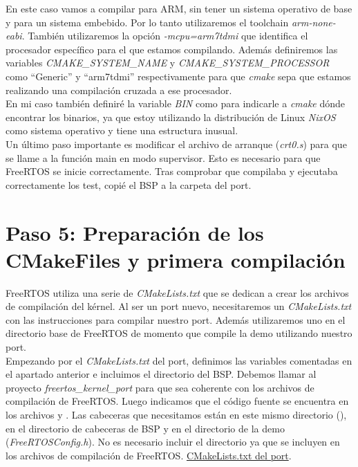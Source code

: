 En este caso vamos a compilar para ARM, sin tener un sistema operativo de base y para un sistema embebido. Por lo tanto utilizaremos el toolchain \emph{arm-none-eabi}. También utilizaremos la opción \emph{-mcpu=arm7tdmi} que identifica el procesador específico para el que estamos compilando. Además definiremos las variables \emph{CMAKE\_SYSTEM\_NAME} y \emph{CMAKE\_SYSTEM\_PROCESSOR} como ``Generic'' y ``arm7tdmi'' respectivamente para que \emph{cmake} sepa que estamos realizando una compilación cruzada a ese procesador.\\


En mi caso también definiré la variable \emph{BIN} como  para indicarle a \emph{cmake} dónde encontrar los binarios, ya que estoy utilizando la distribución de Linux \emph{NixOS} como sistema operativo y tiene una estructura inusual.\\

Un último paso importante es modificar el archivo de arranque (\emph{crt0.s}) para que se llame a la función main en modo supervisor. Esto es necesario para que FreeRTOS se inicie correctamente. Tras comprobar que compilaba y ejecutaba correctamente los test, copié el BSP a la carpeta del port.

\section{Paso 5: Preparación de los CMakeFiles y primera compilación}
FreeRTOS utiliza una serie de \emph{CMakeLists.txt} que se dedican a crear los archivos de compilación del kérnel. Al ser un port nuevo, necesitaremos un \emph{CMakeLists.txt} con las instrucciones para compilar nuestro port. Además utilizaremos uno en el directorio base de FreeRTOS de momento que compile la demo utilizando nuestro port.\\

Empezando por el \emph{CMakeLists.txt} del port, definimos las variables comentadas en el apartado anterior e incluimos el directorio del BSP.
Debemos llamar al proyecto \emph{freertos\_kernel\_port} para que sea coherente con los archivos de compilación de FreeRTOS.
Luego indicamos que el código fuente se encuentra en los archivos  y .
Las cabeceras que necesitamos están en este mismo directorio (), en el directorio de cabeceras de BSP y en el directorio de la demo (\emph{FreeRTOSConfig.h}).
No es necesario incluir el directorio  ya que se incluyen en los archivos de compilación de FreeRTOS.
\href{https://github.com/epaubert/FreeRTOS-kérnel-TFG/blob/4748471870b78355a33cddd2345bfabb41335613/portable/GCC/ARM7_MC13224V/CMakeLists.txt}{CMakeLists.txt del port}.\\

